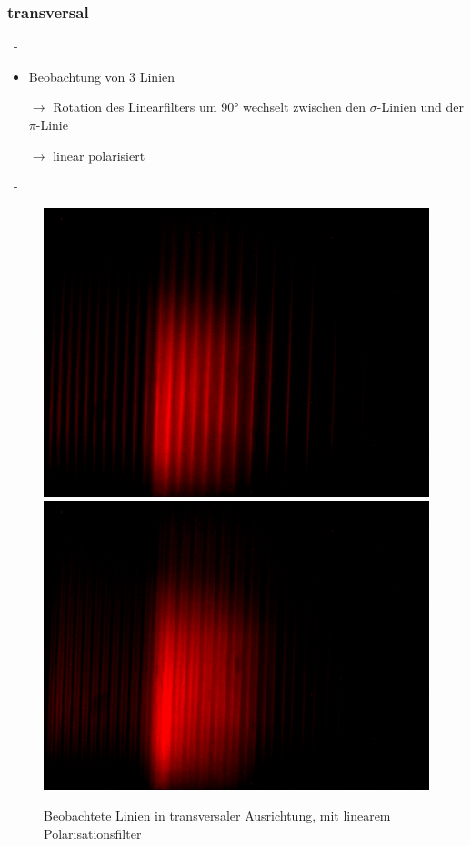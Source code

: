       \subsubsection{transversal}
        \begin{myframe}{\subsecname\ - \subsubsecname}
           \begin{itemize}
             \item Beobachtung von 3 Linien
             \item[$\rightarrow$] Rotation des Linearfilters um 90° wechselt zwischen den $\sigma$-Linien und der $\pi$-Linie
             \item[$\rightarrow$] linear polarisiert
           \end{itemize}
        \end{myframe}

        \begin{myframe}{\subsecname\ - \subsubsecname}
          \begin{figure}
            \includegraphics[width=.8\paperwidth, trim={0 300pt 0 900pt}, clip]{img/trans_pi}
            \includegraphics[width=.8\paperwidth, trim={0 300pt 0 900pt}, clip]{img/trans_sig}
            \caption{Beobachtete Linien in transversaler Ausrichtung, mit linearem Polarisationsfilter}
            \label{trans}
          \end{figure}
        \end{myframe}

